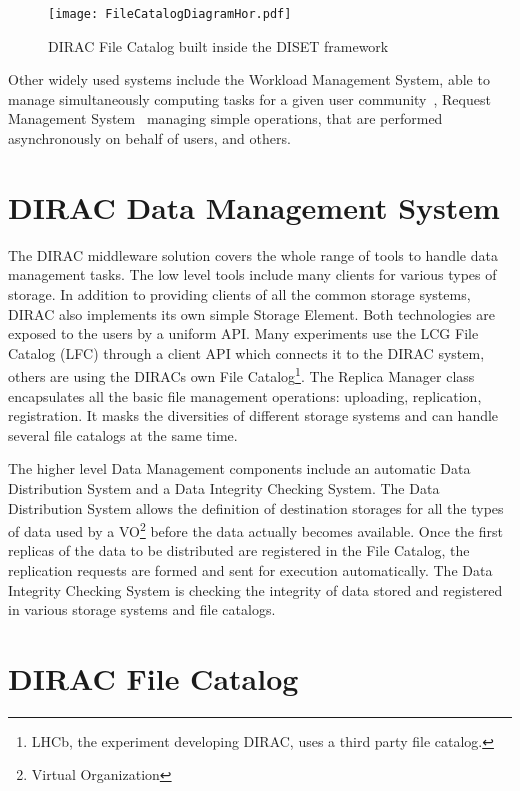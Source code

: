 \begin{figure}[b]
	\centering
	\texttt{[image: FileCatalogDiagramHor.pdf]}
	\caption{DIRAC File Catalog built inside the DISET framework}
	\label{fig:FCDiag}
\end{figure}

Other widely used systems include the Workload Management System, able to manage simultaneously computing
tasks for a given user community~\cite{WMS}, Request Management System~\cite{RMS} managing simple operations, that 
are performed asynchronously on behalf of users, and others. 

\section{DIRAC Data Management System}

The DIRAC middleware solution covers the whole range of tools to handle data management tasks. The low level 
tools include many clients for various types of storage. In addition to providing clients of all 
the common storage systems, DIRAC also implements its own simple Storage Element. Both technologies are 
exposed to the users by a uniform API. Many experiments use the LCG
File Catalog (LFC) through a client API which connects it to the DIRAC system, others are using 
the DIRACs own File Catalog\footnote{LHCb, the experiment developing DIRAC, uses a third party file catalog.}. 
The Replica Manager class encapsulates all the basic file 
management operations: uploading, replication, registration. It masks the diversities 
of different storage systems and can handle several file catalogs at the same time. 

The higher level Data Management components include an automatic Data Distribution System and
a Data Integrity Checking System. The Data Distribution System allows the definition of destination storages
for all the types of data used by a VO\footnote{Virtual Organization} before the data actually becomes available. 
Once the first replicas
of the data to be distributed are registered in the File Catalog, the replication requests are formed and
sent for execution automatically. The Data Integrity Checking System is checking the integrity of data stored and
registered in various storage systems and file catalogs. 

\section{DIRAC File Catalog}

